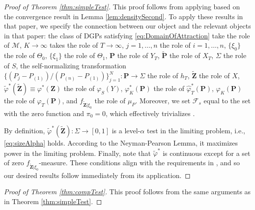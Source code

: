 \begin{proof}[Proof of Theorem \ref{thm:simpleTest}]
This proof follows from applying \citet[Theorem 1]{muller:2011} based on the convergence result in Lemma \ref{lem:densitySecond}. To apply these results in that paper, we specify the connection between our object and the relevant objects in that paper: the class of DGPs satisfying \eqref{eq:DomainOfAttraction} take the role of $\mathcal{M}$, $K\to \infty$ takes the role of $T\to \infty$, $j=1,\ldots ,n$ the role of $ i=1,\ldots ,n$, $\{ \xi _{0}\} $ the role of $\Theta _{0}$, $ \{ \xi _{1}\} $ the role of $\Theta _{1}$, $\mathbf{{P}}$ the role of $Y_{T}$, $\mathbf{\tilde{P}}$ the role of $X_{T}$, $\Sigma $ the role of $S$, the self-normalizing transformation $\{( P_{j}-P_{( 1) })/( P_{( n) }-P_{( 1) })\}_{j=1}^{N}:\mathbf{P} \to \Sigma$ the role of $h_{T}$, $\mathbf{\tilde{Z}}$ the role of $X$, $\tilde{\varphi}^{\ast }(\mathbf{\tilde{Z}}) \equiv {\varphi}^{\ast }(\mathbf{{Z}}) $ the role of $\varphi _{S}( Y) $, $\varphi _{K}^{\ast }( \mathbf{P}) $ the role of $\hat{\varphi}_{T}^{\ast }( \mathbf{P}) $, $\varphi _{K}( \mathbf{P}) $ the role of $\varphi _{T}(\mathbf{P}) $, and $f_{\mathbf{\tilde{Z}}|\xi _{0}}$ the role of $\mu _{P}$. Moreover, we set $\mathcal{F}_s$ equal to the set with the zero function and $\pi_0=0$, which effectively trivializes \citet[Equations (5)-(6) and (10)-(11)]{muller:2011}.

By definition, $\tilde{\varphi}^{\ast }(\mathbf{\tilde{Z}}):\Sigma \to [ 0,1]$ is a level-$\alpha $ test in the limiting problem, i.e., \eqref{eq:sizeAlpha} holds. According to the Neyman-Pearson Lemma, it maximizes power in the limiting problem. Finally, note that $\tilde{\varphi}^{\ast }$ is continuous except for a set of zero $f_{\mathbf{\tilde{Z}}|\xi _{0}}$-measure. These conditions align with the requirements in \citet[Theorem 1]{muller:2011}, and so our desired results follow immediately from its application.
\end{proof}

\begin{proof}[Proof of Theorem \ref{thm:compTest}]
This proof follows from the same arguments as in Theorem \ref{thm:simpleTest}.
\end{proof}

